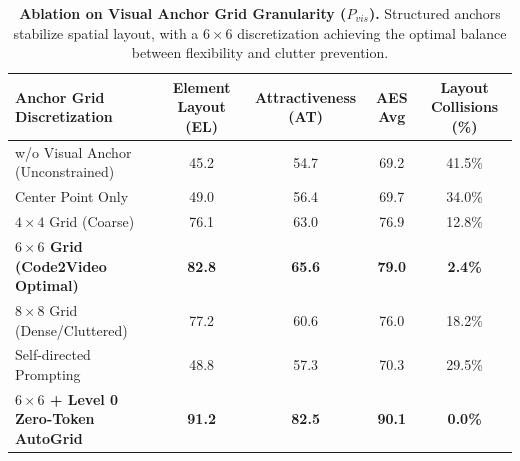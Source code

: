 \begin{table}[h]
\centering
\small
\caption{\textbf{Ablation on Visual Anchor Grid Granularity ($P_{vis}$).} 
Structured anchors stabilize spatial layout, with a $6 \times 6$ discretization achieving the optimal balance between flexibility and clutter prevention.}
\label{tab:anchor_granularity}
\begin{tabular}{lcccc}
\toprule
\textbf{Anchor Grid Discretization} & \textbf{Element Layout (EL)} & \textbf{Attractiveness (AT)} & \textbf{AES Avg} & \textbf{Layout Collisions (\%)} \\
\midrule
w/o Visual Anchor (Unconstrained) & 45.2 & 54.7 & 69.2 & 41.5\% \\
Center Point Only & 49.0 & 56.4 & 69.7 & 34.0\% \\
$4 \times 4$ Grid (Coarse) & 76.1 & 63.0 & 76.9 & 12.8\% \\
\textbf{$6 \times 6$ Grid (Code2Video Optimal)} & \textbf{82.8} & \textbf{65.6} & \textbf{79.0} & \textbf{2.4\%} \\
$8 \times 8$ Grid (Dense/Cluttered) & 77.2 & 60.6 & 76.0 & 18.2\% \\
Self-directed Prompting & 48.8 & 57.3 & 70.3 & 29.5\% \\
\midrule
\textbf{$6 \times 6$ + Level 0 Zero-Token AutoGrid} & \textbf{91.2} & \textbf{82.5} & \textbf{90.1} & \textbf{0.0\%} \\
\bottomrule
\end{tabular}
\end{table}